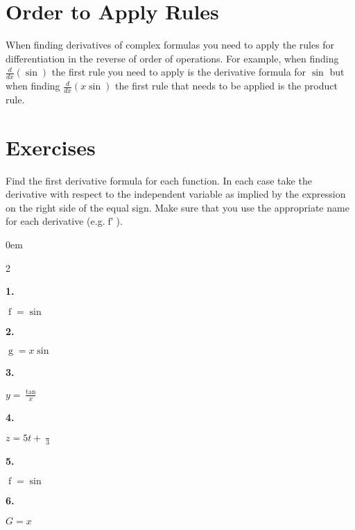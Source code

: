 \documentclass[12pt,]{book}
\theoremstyle{plain}
\theoremstyle{definition}
\numberwithin{equation}{section}
\newenvironment{exercisegroup}%
{\medskip\noindent}%
{\par\bigskip}%
\newlength{\exercisegroupindent}%
\newlength{\exercisegroupitemwidth}%
\newenvironment{exercisegrouplist}%
{\vspace{-\partopsep}%
\begin{adjustwidth}{\exercisegroupindent}{0em}}%
{\end{adjustwidth}%
\vspace{-\partopsep}%
\vspace{\baselineskip}}%
\newenvironment{exercisegroupbycol}[1]%
{\begin{exercisegrouplist}%
\vspace{-\multicolsep}%
\begin{multicols}{#1}%
\setlength{\parindent}{0em}%
\setlength{\exercisegroupitemwidth}{\linewidth}}%
{\end{multicols}%
\vspace{-\multicolsep}%
\end{exercisegrouplist}}%
\newenvironment{exercisegroupitem}[1]%
{\begin{minipage}[t]{\exercisegroupitemwidth}
\vspace{0pt}%
{\bfseries#1}%
\rule{0pt}{\baselineskip}}{\strut%
\end{minipage}%
\hspace{\columnsep}}%
\providecommand\phantomsection{}
\newcommand{\fe}[2]{\mathop{{#1}{\left(#2\right)}}}
\newcommand{\fd}[1]{#1'}
\newcommand{\lzoo}[2]{{\frac{d}{d#1}}{\left(#2\right)}}
\begin{document}
\section[Order to Apply Rules]{Order to Apply Rules}\label{section-order-to-apply-rules}
When finding derivatives of complex formulas you need to apply the rules for differentiation in the reverse of order of operations.  For example, when finding \(\lzoo{x}{\fe{\sin}{x\,e^x}}\) the first rule you need to apply is the derivative formula for \(\fe{\sin}{u}\) but when finding \(\lzoo{x}{x\fe{\sin}{e^x}}\) the first rule that needs to be applied is the product rule.%
\typeout{************************************************}
\typeout{************************************************}
\section*{Exercises}\label{exercises-39}

\begin{exercisegroup}%
Find the first derivative formula for each function.  In each case take the derivative with respect to the independent variable as implied by the expression on the right side of the equal sign.  Make sure that you use the appropriate name for each derivative (e.g.\@ \(\fe{\fd{f}}{x}\)).%
\begin{exercisegroupbycol}{2}%
\begin{exercisegroupitem}{1. }\phantomsection\hypertarget{exercise-294}{\null}
\(\fe{f}{x}=\fe{\sin}{x\,e^x}\)%
\end{exercisegroupitem}%
\par%
\begin{exercisegroupitem}{2. }\phantomsection\hypertarget{exercise-295}{\null}
\(\fe{g}{x}=x\fe{\sin}{e^x}\)%
\end{exercisegroupitem}%
\par%
\begin{exercisegroupitem}{3. }\phantomsection\hypertarget{exercise-296}{\null}
\(y=\frac{\fe{\tan}{\fe{\ln}{x}}}{x}\)%
\end{exercisegroupitem}%
\par%
\begin{exercisegroupitem}{4. }\phantomsection\hypertarget{exercise-297}{\null}
\(z=5t+\frac{\fe{\cos^2}{t^2}}{3}\)%
\end{exercisegroupitem}%
\par%
\begin{exercisegroupitem}{5. }\phantomsection\hypertarget{exercise-298}{\null}
\(\fe{f}{y}=\fe{\sin}{\frac{\fe{\ln}{y}}{y}}\)%
\end{exercisegroupitem}%
\par%
\begin{exercisegroupitem}{6. }\phantomsection\hypertarget{exercise-299}{\null}
\(G=x\fe{\sin^{-1}}{x\fe{\ln}{x}}\)%
\end{exercisegroupitem}%
\par%
\end{exercisegroupbycol}%
\end{exercisegroup}%
\typeout{************************************************}
\typeout{************************************************}
\end{document}
